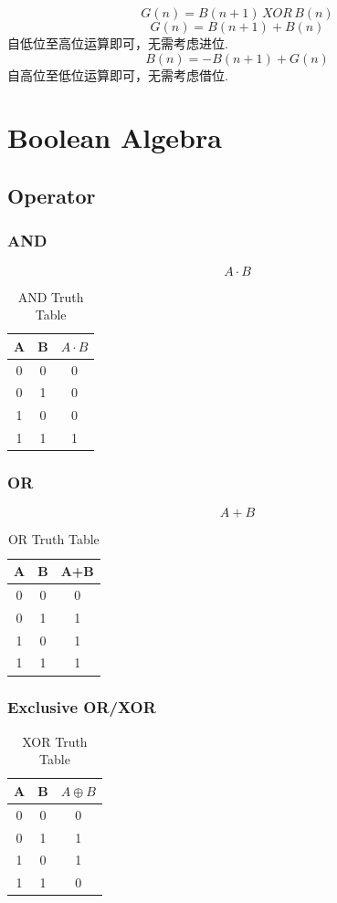 \documentclass[scheme=chinese,a4paper]{report}
\begin{document}
$$ G(n)=B(n+1) \, XOR \, B(n) $$
$$ G(n) = B(n+1) + B(n) $$
自低位至高位运算即可，无需考虑进位. 
$$ B(n) = -B(n+1)+ G(n) $$
自高位至低位运算即可，无需考虑借位. 


\chapter{Boolean Algebra}
\section{Operator}
\subsection{AND}
$$A\cdot B$$
\begin{table}[htb]
    \centering
    \begin{tabular}{c c c}
    A&B&$A\cdot B$\\
    \hline
    0&0&0\\
    0&1&0\\
    1&0&0\\
    1&1&1\\
    \end{tabular}
    \caption{AND Truth Table}
\end{table}

\subsection{OR}
$$A+B$$
\begin{table}[htb]
    \centering
    \begin{tabular}{c c c}
    A&B&A+B\\
    \hline
    0&0&0\\
    0&1&1\\
    1&0&1\\
    1&1&1\\
    \end{tabular}
    \caption{OR Truth Table}
\end{table}

\subsection{Exclusive OR/XOR}
\begin{table}[htb]
    \centering
    \begin{tabular}{c c c}
    A&B&$A\oplus B$\\
    \hline
    0&0&0\\
    0&1&1\\
    1&0&1\\
    1&1&0\\
    \end{tabular}
    \caption{XOR Truth Table}
\end{table}
\end{document}
